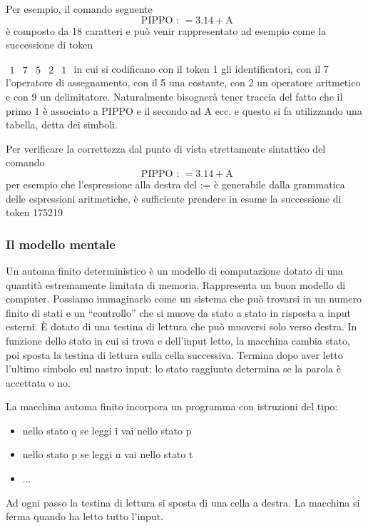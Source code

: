 Per esempio, il comando seguente
$$
\text { PIPPO : }=3.14+\mathrm{A}
$$
è composto da 18 caratteri e può venir rappresentato ad esempio come la successione di token

$\begin{array}{lllll}1 & 7 & 5 & 2 & 1\end{array}$
in cui si codificano con il token 1 gli identificatori, con il 7 l'operatore di assegnamento, con il 5 una costante, con 2 un operatore aritmetico e con 9 un delimitatore. Naturalmente bisognerà tener traccia del fatto che il primo 1 è associato a PIPPO e il secondo ad A ecc. e questo si fa utilizzando una tabella, detta dei simboli.

\vspace{5mm}

Per verificare la correttezza dal punto di vista strettamente sintattico del comando
$$
\text { PIPPO : }=3.14+\mathrm{A}
$$
per esempio che l'espressione alla destra del := è generabile dalla grammatica delle espressioni aritmetiche, è sufficiente prendere in esame la successione di token
175219

\subsubsection{Il modello mentale}
Un automa ﬁnito deterministico è un modello di computazione dotato di una quantità estremamente limitata di memoria. Rappresenta un buon modello di computer.
Possiamo immaginarlo come un sistema che può trovarsi in un numero ﬁnito di stati e un “controllo” che si muove da stato a stato in risposta a input esterni.
È dotato di una testina di lettura che può muoversi solo verso destra.
In funzione dello stato in cui si trova e dell’input letto, la macchina cambia stato, poi sposta la testina di lettura sulla cella successiva.
Termina dopo aver letto l’ultimo simbolo sul nastro input; lo stato raggiunto determina se la parola è accettata o no.

\vspace{5mm}

La macchina automa ﬁnito incorpora un programma con istruzioni del tipo:
\begin{itemize}
    \item nello stato q se leggi i vai nello stato p
    \item nello stato p se leggi n vai nello stato t
    \item ...
\end{itemize}
Ad ogni passo la testina di lettura si sposta di una cella a destra.
La macchina si ferma quando ha letto tutto l’input.

